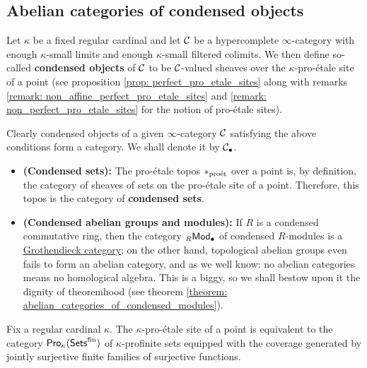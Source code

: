         \subsection{Abelian categories of condensed objects}
            \begin{definition}[Condensation] \label{def: condensation}
                Let $\kappa$ be a fixed regular cardinal and let $\mathcal{C}$ be a hypercomplete $\infty$-category with enough $\kappa$-small limits and enough $\kappa$-small filtered colimits. We then define so-called \textbf{condensed objects} of $\mathcal{C}$ to be $\mathcal{C}$-valued sheaves over the $\kappa$-pro-\'etale site of a point (see proposition \ref{prop: perfect_pro_etale_sites} along with remarks \ref{remark: non_affine_perfect_pro_etale_sites} and \ref{remark: non_perfect_pro_etale_sites} for the notion of pro-\'etale sites).  
                
                Clearly condensed objects of a given $\infty$-category $\mathcal{C}$ satisfying the above conditions form a category. We shall denote it by $\mathcal{C}_{\bullet}$.
            \end{definition}
            \begin{example}
                \noindent
                \begin{itemize}
                    \item \textbf{(Condensed sets):} The pro-\'etale topos $*_{\mathrm{pro\acute{e}t}}$ over a point is, by definition, the category of sheaves of sets on the pro-\'etale site of a point. Therefore, this topos is the category of \textbf{condensed sets}.
                    \item \textbf{(Condensed abelian groups and modules):} If $R$ is a condensed commutative ring, then the category ${}_R\mathsf{Mod}_{\bullet}$ of condensed $R$-modules is a \href{https://ncatlab.org/nlab/show/Grothendieck+category}{\underline{Grothendieck category}}; on the other hand, topological abelian groups even fails to form an abelian category, and as we well know: no abelian categories means no homological algebra. This is a biggy, so we shall bestow upon it the dignity of theoremhood (see theorem \ref{theorem: abelian_categories_of_condensed_modules}).
                \end{itemize}
            \end{example}
            \begin{remark} \label{remark: condensation_and_profiniteness}
                Fix a regular cardinal $\kappa$. The $\kappa$-pro-\'etale site of a point is equivalent to the category $\mathsf{Pro}_{\kappa}(\mathsf{Sets}^{\mathrm{fin}})$ of $\kappa$-profinite sets equipped with the coverage generated by jointly surjective finite families of surjective functions. 
            \end{remark}
            

